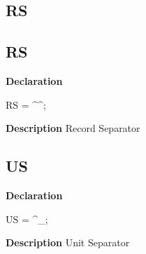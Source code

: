 \documentclass{report}
\newif\ifpdf
\begin{document}
\subsection*{\large{\textbf{RS}}\normalsize\hspace{1ex}\hrulefill}
\else
\subsection*{RS}
\fi
\label{ok_caret_character-RS}
\begin{list}{}{
\setlength{\itemindent}{0cm}
\setlength{\listparindent}{0cm}
\setlength{\leftmargin}{\evensidemargin}
\addtolength{\leftmargin}{\tmplength}
\settowidth{\labelsep}{X}
\addtolength{\leftmargin}{\labelsep}
\setlength{\labelwidth}{\tmplength}
}
\item[\textbf{Declaration}\hfill]
\ifpdf
\begin{flushleft}
\fi
\begin{ttfamily}
RS  = {\^{}}{\^{}};\end{ttfamily}

\ifpdf
\end{flushleft}
\fi

\par
\item[\textbf{Description}]
Record Separator

\end{list}
\ifpdf
\subsection*{\large{\textbf{US}}\normalsize\hspace{1ex}\hrulefill}
\else
\subsection*{US}
\fi
\label{ok_caret_character-US}
\begin{list}{}{
\setlength{\itemindent}{0cm}
\setlength{\listparindent}{0cm}
\setlength{\leftmargin}{\evensidemargin}
\addtolength{\leftmargin}{\tmplength}
\settowidth{\labelsep}{X}
\addtolength{\leftmargin}{\labelsep}
\setlength{\labelwidth}{\tmplength}
}
\item[\textbf{Declaration}\hfill]
\ifpdf
\begin{flushleft}
\fi
\begin{ttfamily}
US  = {\^{}}{\_};\end{ttfamily}

\ifpdf
\end{flushleft}
\fi

\par
\item[\textbf{Description}]
Unit Separator

\end{list}
\end{document}
